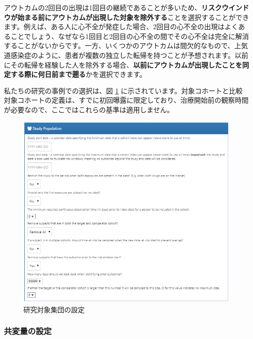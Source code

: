 \documentclass[
  11pt]{book}
\theoremstyle{definition}
\theoremstyle{definition}
\theoremstyle{definition}
\theoremstyle{definition}
\theoremstyle{remark}
\begin{document}
アウトカムの2回目の出現は1回目の継続であることが多いため、\textbf{リスクウインドウが始まる前にアウトカムが出現した対象を除外する}ことを選択することができます。例えば、ある人に心不全が発症した場合、2回目の心不全の出現はよくあることでしょう、なぜなら1回目と2回目の心不全の間でその心不全は完全に解消することがないからです。一方、いくつかのアウトカムは間欠的なもので、上気道感染症のように、患者が複数の独立した転帰を持つことが予想されます。以前にその転帰を経験した人を除外する場合、\textbf{以前にアウトカムが出現したことを同定する際に何日前まで遡る}かを選択できます。

私たちの研究の事例での選択は、図 \ref{fig:studyPopulation} に示されています。対象コホートと比較対象コホートの定義は、すでに初回曝露に限定しており、治療開始前の観察時間が必要なので、ここではこれらの基準は適用しません。

\begin{figure}

{\centering \includegraphics[width=1\linewidth]{images/PopulationLevelEstimation/studyPopulation} 

}

\caption{研究対象集団の設定}\label{fig:studyPopulation}
\end{figure}

\subsubsection*{共変量の設定}\label{ux5171ux5909ux91cfux306eux8a2dux5b9a}
\end{document}
